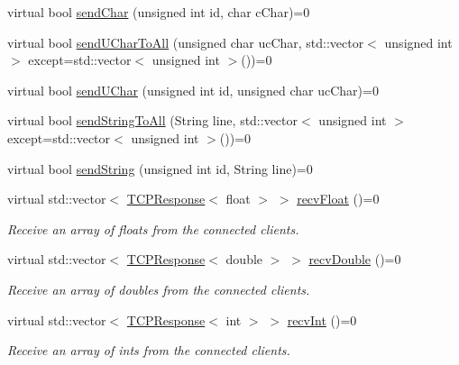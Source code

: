 \begin{DoxyCompactItemize}
\item 
virtual bool \hyperlink{class_rad_jav_1_1_networking_1_1_tcpip_server_a79c98552dd1e863008f7d2c06a4eece9}{send\+Char} (unsigned int id, char c\+Char)=0
\item 
virtual bool \hyperlink{class_rad_jav_1_1_networking_1_1_tcpip_server_adfb547ad5afafc407e13cb0e6155a1ce}{send\+U\+Char\+To\+All} (unsigned char uc\+Char, std\+::vector$<$ unsigned int $>$ except=std\+::vector$<$ unsigned int $>$())=0
\item 
virtual bool \hyperlink{class_rad_jav_1_1_networking_1_1_tcpip_server_aac0a92d1b876b5385d43e7c5ca79015e}{send\+U\+Char} (unsigned int id, unsigned char uc\+Char)=0
\item 
virtual bool \hyperlink{class_rad_jav_1_1_networking_1_1_tcpip_server_ab4af62e60623ac705f48058696bf79e0}{send\+String\+To\+All} (String line, std\+::vector$<$ unsigned int $>$ except=std\+::vector$<$ unsigned int $>$())=0
\item 
virtual bool \hyperlink{class_rad_jav_1_1_networking_1_1_tcpip_server_a789b37a7ef39752ce314db38ec9e53d5}{send\+String} (unsigned int id, String line)=0
\item 
virtual std\+::vector$<$ \hyperlink{class_rad_jav_1_1_networking_1_1_t_c_p_response}{T\+C\+P\+Response}$<$ float $>$ $>$ \hyperlink{class_rad_jav_1_1_networking_1_1_tcpip_server_a429af700100fdc2a2f8d73addb2c8024}{recv\+Float} ()=0
\begin{DoxyCompactList}\small\item\em Receive an array of floats from the connected clients. \end{DoxyCompactList}\item 
virtual std\+::vector$<$ \hyperlink{class_rad_jav_1_1_networking_1_1_t_c_p_response}{T\+C\+P\+Response}$<$ double $>$ $>$ \hyperlink{class_rad_jav_1_1_networking_1_1_tcpip_server_a2d4c11a03917372efda0319427f9cbed}{recv\+Double} ()=0
\begin{DoxyCompactList}\small\item\em Receive an array of doubles from the connected clients. \end{DoxyCompactList}\item 
virtual std\+::vector$<$ \hyperlink{class_rad_jav_1_1_networking_1_1_t_c_p_response}{T\+C\+P\+Response}$<$ int $>$ $>$ \hyperlink{class_rad_jav_1_1_networking_1_1_tcpip_server_a58b0dc1f592091bcf25175fcffedf8d0}{recv\+Int} ()=0
\begin{DoxyCompactList}\small\item\em Receive an array of ints from the connected clients. \end{DoxyCompactList}\item 

\end{DoxyCompactItemize}
